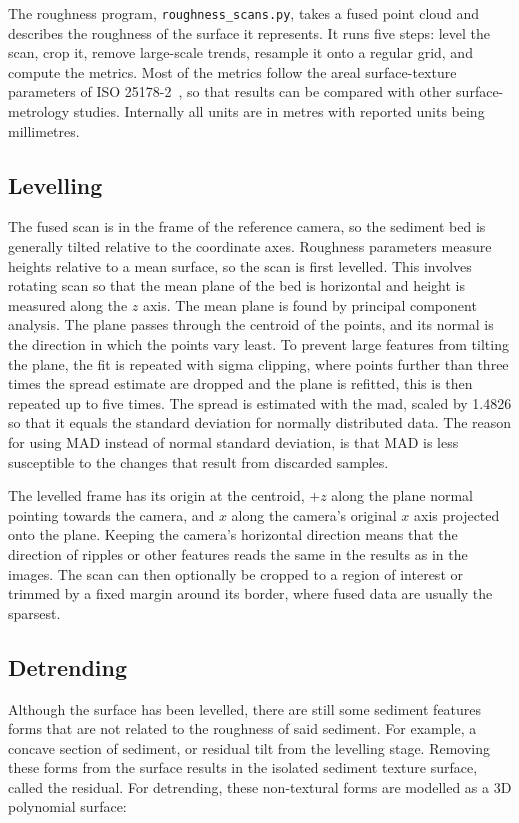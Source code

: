 The roughness program, \texttt{roughness\_scans.py}, takes a fused point cloud and describes the roughness of the surface it represents. It runs five steps: level the scan, crop it, remove large-scale trends, resample it onto a regular grid, and compute the metrics. Most of the metrics follow the areal surface-texture parameters of ISO 25178-2~\cite{ISO2517822021}, so that results can be compared with other surface-metrology studies. Internally all units are in metres with reported units being millimetres.

\subsection{Levelling}

The fused scan is in the frame of the reference camera, so the sediment bed is generally tilted relative to the coordinate axes. Roughness parameters measure heights relative to a mean surface, so the scan is first levelled. This involves rotating scan so that the mean plane of the bed is horizontal and height is measured along the $z$ axis. The mean plane is found by principal component analysis. The plane passes through the centroid of the points, and its normal is the direction in which the points vary least. To prevent large features from tilting the plane, the fit is repeated with sigma clipping, where points further than three times the spread estimate are dropped and the plane is refitted, this is then repeated up to five times. The spread is estimated with the \gls{mad}, scaled by 1.4826 so that it equals the standard deviation for normally distributed data. The reason for using MAD instead of normal standard deviation, is that MAD is less susceptible to the changes that result from discarded samples.

The levelled frame has its origin at the centroid, $+z$ along the plane normal pointing towards the camera, and $x$ along the camera's original $x$ axis projected onto the plane. Keeping the camera's horizontal direction means that the direction of ripples or other features reads the same in the results as in the images. The scan can then optionally be cropped to a region of interest or trimmed by a fixed margin around its border, where fused data are usually the sparsest.

\subsection{Detrending}

Although the surface has been levelled, there are still some sediment features forms that are not related to the roughness of said sediment. For example, a concave section of sediment, or residual tilt from the levelling stage. Removing these forms from the surface results in the isolated sediment texture surface, called the residual. For detrending, these non-textural forms are modelled as a 3D polynomial surface:

